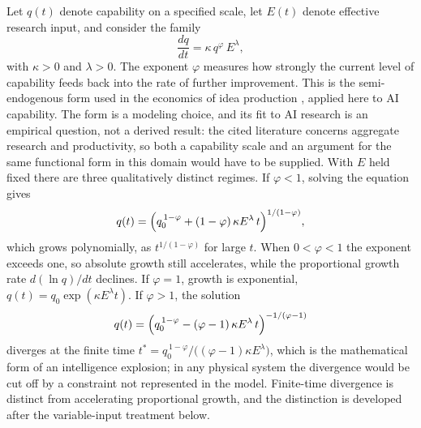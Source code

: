 \documentclass[11pt]{article}
\begin{document}
Let $q(t)$ denote capability on a specified scale, let $E(t)$ denote effective research input, and consider the family
\[
\frac{dq}{dt} = \kappa\, q^{\varphi}\, E^{\lambda},
\]
with $\kappa>0$ and $\lambda>0$. The exponent $\varphi$ measures how strongly the current level of capability feeds back into the rate of further improvement. This is the semi-endogenous form used in the economics of idea production \cite{Jones1995,Jones2005}, applied here to AI capability. The form is a modeling choice, and its fit to AI research is an empirical question, not a derived result: the cited literature concerns aggregate research and productivity, so both a capability scale and an argument for the same functional form in this domain would have to be supplied. With $E$ held fixed there are three qualitatively distinct regimes. If $\varphi<1$, solving the equation gives
\[
q(t)=\Bigl(q_0^{\,1-\varphi}+(1-\varphi)\,\kappa E^{\lambda}\,t\Bigr)^{1/(1-\varphi)},
\]
which grows polynomially, as $t^{1/(1-\varphi)}$ for large $t$. When $0<\varphi<1$ the exponent exceeds one, so absolute growth still accelerates, while the proportional growth rate $d(\ln q)/dt$ declines. If $\varphi=1$, growth is exponential, $q(t)=q_0\exp(\kappa E^{\lambda}t)$. If $\varphi>1$, the solution
\[
q(t)=\Bigl(q_0^{\,1-\varphi}-(\varphi-1)\,\kappa E^{\lambda}\,t\Bigr)^{-1/(\varphi-1)}
\]
diverges at the finite time $t^{*}=q_0^{\,1-\varphi}/\bigl((\varphi-1)\kappa E^{\lambda}\bigr)$, which is the mathematical form of an intelligence explosion; in any physical system the divergence would be cut off by a constraint not represented in the model. Finite-time divergence is distinct from accelerating proportional growth, and the distinction is developed after the variable-input treatment below.
\end{document}
